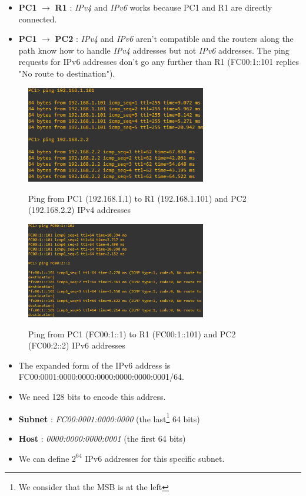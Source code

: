 \documentclass[10pt,a4paper]{ULBreport}
\begin{document}
\begin{itemize}
    \item \textbf{PC1} $\rightarrow$ \textbf{R1} : \textit{IPv4} and \textit{IPv6} works because PC1 and R1 are directly connected.
    \item \textbf{PC1} $\rightarrow$ \textbf{PC2} : \textit{IPv4} and \textit{IPv6} aren't compatible and the routers along the path know how to handle \textit{IPv4} addresses but not \textit{IPv6} addresses. The ping requests for IPv6 addresses don't go any further than R1 (FC00:1::101 replies "No route to destination").
\end{itemize}

\begin{figure}[H]
    \caption{Ping from PC1 (192.168.1.1) to R1 (192.168.1.101) and PC2 (192.168.2.2) IPv4 addresses}
    \centering
    \includegraphics[width=0.7\textwidth]{Images/pingIPV4.png}
    \label{ipv4}
  \end{figure}

  \begin{figure}[H]
    \caption{Ping from PC1 (FC00:1::1) to R1 (FC00:1::101) and PC2 (FC00:2::2) IPv6 addresses}
    \centering
    \includegraphics[width=0.7\textwidth]{Images/pingIPV6.png}
    \label{ipv6}
  \end{figure}




\begin{itemize}
    \item The expanded form of the IPv6 address is FC00:0001:0000:0000:0000:0000:0000:0001/64.
    \item We need 128 bits to encode this address.
    \item \textbf{Subnet} : \textit{FC00:0001:0000:0000} (the last\footnote{We consider that the MSB is at the left} 64 bits)
    \item \textbf{Host} : \textit{0000:0000:0000:0001} (the first 64 bits)
    \item We can define $2^{64}$ IPv6 addresses for this specific subnet.
\end{itemize}
\end{document}
